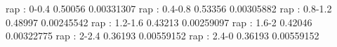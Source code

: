 rap : 0-0.4
0.50056 0.00331307
rap : 0.4-0.8
0.53356 0.00305882
rap : 0.8-1.2
0.48997 0.00245542
rap : 1.2-1.6
0.43213 0.00259097
rap : 1.6-2
0.42046 0.00322775
rap : 2-2.4
0.36193 0.00559152
rap : 2.4-0
0.36193 0.00559152
